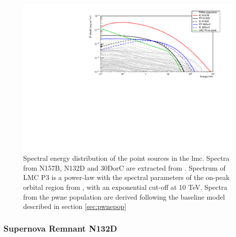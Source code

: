 \documentclass[main.tex]{subfiles}
\begin{document}
\begin{figure}[h]
  \centering
  \includegraphics[width=\textwidth]{Pictures/pointsourcesspec.pdf}
  \caption{\label{fig:PS} Spectral energy distribution of the point sources in the \gls{lmc}. Spectra from N157B, N132D and 30DorC are extracted from \cite{2015HESSTeVLMC}. Spectrum of LMC P3 is a power-law with the spectral parameters of the on-peak orbital region from \cite{2017HESSLMCP3}, with an exponential cut-off at 10 TeV. Spectra from the \gls{pwne} population are derived following the baseline model described in section \ref{sec:pwnepop}}
\end{figure}

\subsubsection{Supernova Remnant N132D}
\end{document}

